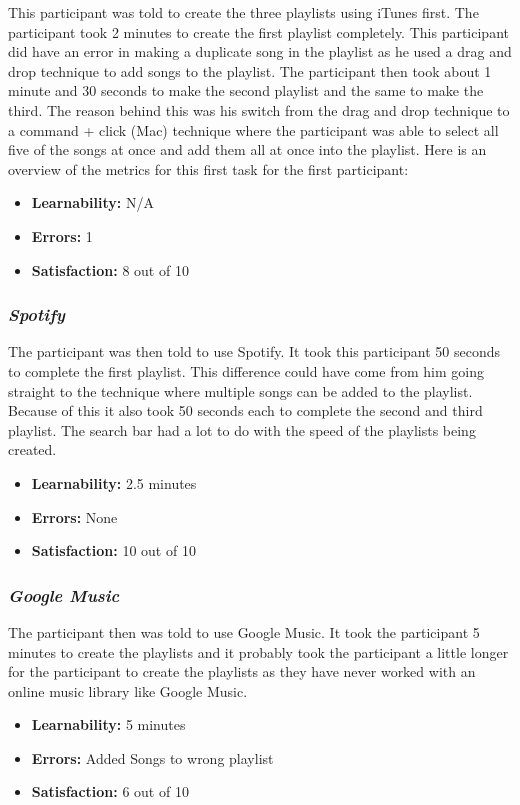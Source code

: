 \documentclass{article}
\begin{document}
{\begin{multicols}{2}
This participant was told to create the three playlists using iTunes first. The participant took 2 minutes to create the first playlist completely. This participant did have an error in making a duplicate song in the playlist as he used a drag and drop technique to add songs to the playlist. The participant then took about 1 minute and 30 seconds to make the second playlist and the same to make the third. The reason behind this was his switch from the drag and drop technique to a command + click (Mac) technique where the participant was able to select all five of the songs at once and add them all at once into the playlist. Here is an overview of the metrics for this first task for the first participant:
\begin{itemize}
	\item {\bf Learnability:} N/A
	\item {\bf Errors:} 1
	\item {\bf Satisfaction:} 8 out of 10 
\end{itemize}

\subsubsection{\it Spotify}
The participant was then told to use Spotify. It took this participant 50 seconds to complete the first playlist. This difference could have come from him going straight to the technique where multiple songs can be added to the playlist. Because of this it also took 50 seconds each to complete the second and third playlist. The search bar had a lot to do with the speed of the playlists being created.
\begin{itemize}
	\item {\bf Learnability:} 2.5 minutes
	\item {\bf Errors:} None
	\item {\bf Satisfaction:} 10 out of 10 
\end{itemize}

\subsubsection{\it Google Music}
The participant then was told to use Google Music. It took the participant 5 minutes to create the playlists and it probably took the participant a little longer for the participant to create the playlists as they have never worked with an online music library like Google Music.
\begin{itemize}
\item {\bf Learnability:} 5 minutes
	\item {\bf Errors:} Added Songs to wrong playlist
	\item {\bf Satisfaction:} 6 out of 10 
\end{itemize}


\end{multicols}}
\end{document}
